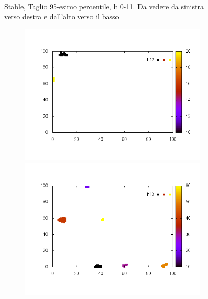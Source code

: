 \documentclass[10pt,a4paper]{article}
\begin{document}
\begin{figure}
\begin{subfigure}[b]{1\textwidth}
\end{subfigure}
\caption{Stable, Taglio 95-esimo percentile, h 0-11. Da vedere da sinistra verso destra e dall'alto verso il basso}
\end{figure}

\begin{figure}
\centering

\begin{subfigure}[b]{1\textwidth}
\includegraphics[scale=.3]{./img/SCC_Stable3/cut95p/12.png}
\includegraphics[scale=.3]{./img/SCC_Stable3/cut95p/13.png}

\end{subfigure}
\end{figure}
\end{document}
